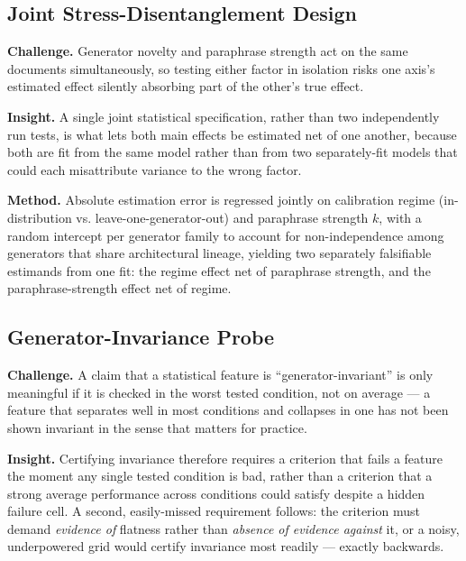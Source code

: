 \documentclass[11pt]{article}
\begin{document}
\subsection{Joint Stress-Disentanglement Design}
\textbf{Challenge.} Generator novelty and paraphrase strength act on the same documents simultaneously, so testing either factor in isolation risks one axis's estimated effect silently absorbing part of the other's true effect.

\textbf{Insight.} A single joint statistical specification, rather than two independently run tests, is what lets both main effects be estimated net of one another, because both are fit from the same model rather than from two separately-fit models that could each misattribute variance to the wrong factor.

\textbf{Method.} Absolute estimation error is regressed jointly on calibration regime (in-distribution vs. leave-one-generator-out) and paraphrase strength $k$, with a random intercept per generator family to account for non-independence among generators that share architectural lineage, yielding two separately falsifiable estimands from one fit: the regime effect net of paraphrase strength, and the paraphrase-strength effect net of regime.

\subsection{Generator-Invariance Probe}
\textbf{Challenge.} A claim that a statistical feature is ``generator-invariant'' is only meaningful if it is checked in the worst tested condition, not on average --- a feature that separates well in most conditions and collapses in one has not been shown invariant in the sense that matters for practice.

\textbf{Insight.} Certifying invariance therefore requires a criterion that fails a feature the moment any single tested condition is bad, rather than a criterion that a strong average performance across conditions could satisfy despite a hidden failure cell. A second, easily-missed requirement follows: the criterion must demand \emph{evidence of} flatness rather than \emph{absence of evidence against} it, or a noisy, underpowered grid would certify invariance most readily --- exactly backwards.
\end{document}
